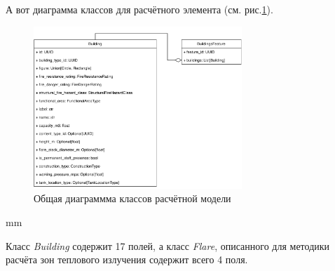 А вот диаграмма классов для расчётного элемента (см. рис.\ref{pic:implementation__model-feature}).
\begin{figure}[H]
	\hspace*{-2.5 cm}\includegraphics[width=0.7\textwidth]{implementation/pictures/model/feature}
	\caption{Общая диаграммма классов расчётной модели}
	\label{pic:implementation__model-feature}
\end{figure}
 mm

Класс \textit{Building} содержит 17 полей, а класс \textit{Flare}, описанного для методики расчёта
зон теплового излучения содержит всего 4 поля.

